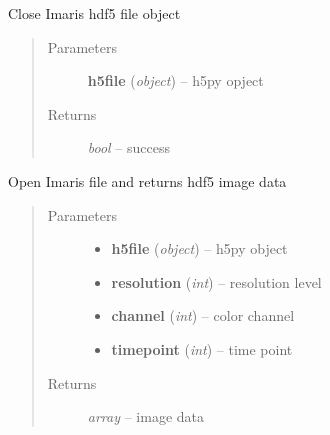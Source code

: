 \documentclass[letterpaper,10pt,english]{sphinxmanual}
\begin{document}
\begin{fulllineitems}
\label{api/ClearMap.IO:ClearMap.IO.Imaris.closeFile}
Close Imaris hdf5 file object
\begin{quote}\begin{description}
\item[{Parameters}] \leavevmode
\textbf{h5file} (\emph{object}) --
h5py opject

\item[{Returns}] \leavevmode
\emph{bool} --
success

\end{description}\end{quote}

\end{fulllineitems}


\begin{fulllineitems}
\label{api/ClearMap.IO:ClearMap.IO.Imaris.readDataSet}
Open Imaris file and returns hdf5 image data
\begin{quote}\begin{description}
\item[{Parameters}] \leavevmode\begin{itemize}
\item {} 
\textbf{h5file} (\emph{object}) --
h5py object

\item {} 
\textbf{resolution} (\emph{int}) --
resolution level

\item {} 
\textbf{channel} (\emph{int}) --
color channel

\item {} 
\textbf{timepoint} (\emph{int}) --
time point

\end{itemize}

\item[{Returns}] \leavevmode
\emph{array} --
image data

\end{description}\end{quote}

\end{fulllineitems}

\end{document}
